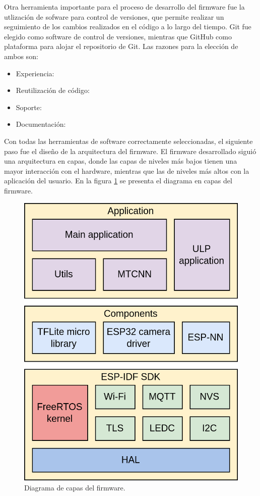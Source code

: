Otra herramienta importante para el proceso de desarrollo del firmware fue la utlización de sofware para control de versiones, que permite realizar un seguimiento de los cambios realizados en el código a lo largo del tiempo. Git fue elegido como software de control de versiones, mientras que GitHub como plataforma para alojar el repositorio de Git. Las razones para la elección de ambos son:
\begin{itemize}
	\item Experiencia:
	\item Reutilización de código:
	\item Soporte:
	\item Documentación:
\end{itemize}

Con todas las herramientas de software correctamente seleccionadas, el siguiente paso fue el diseño de la arquitectura del firmware. El firmware desarrollado siguió una arquitectura en capas, donde las capas de niveles más bajos tienen una mayor interacción con el hardware, mientras que las de niveles más altos con la aplicación del usuario. En la figura \ref{fig:fw_layers} se presenta el diagrama en capas del firmware.

\begin{figure}[h]
	\centering
	\includegraphics[scale=0.25]{./Figures/fw_layers.png}
	\caption{Diagrama de capas del firmware.}
	\label{fig:fw_layers}
\end{figure}

